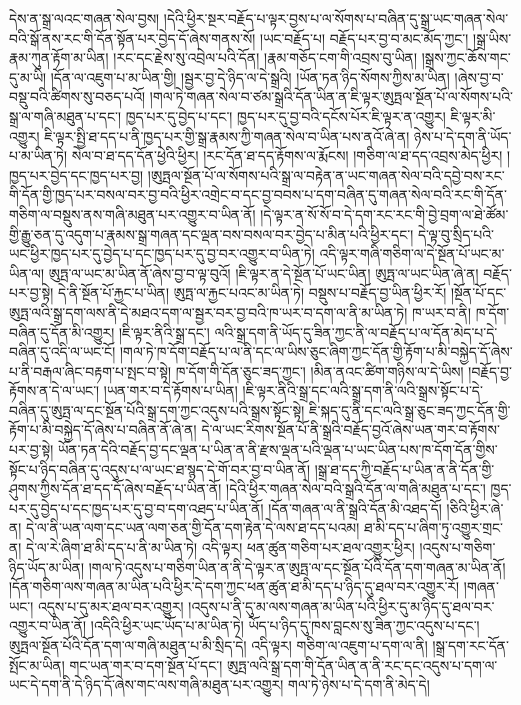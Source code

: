 དེས་ན་སྒྲ་ལའང་གཞན་སེལ་བྱས། །དེའི་ཕྱིར་སྔར་བརྗོད་པ་ལྟར་བྱས་པ་ལ་སོགས་པ་བཞིན་དུ་སྒྲ་ཡང་གཞན་སེལ་བའི་སྒོ་ནས་རང་གི་དོན་སྟོན་པར་བྱེད་དོ་ཞེས་གནས་སོ། །ཡང་བརྗོད་པ། བརྗོད་པར་བྱ་བ་མང་མོད་ཀྱང་། །སྒྲ་ཡིས་རྣམ་ཀུན་རྟོག་མ་ཡིན། །རང་དང་རྗེས་སུ་འབྲེལ་པའི་དོན། །རྣམ་གཅོད་ངག་གི་འབྲས་བུ་ཡིན། །སྒྲས་ཀྱང་ཆོས་གང་དུ་མ་ཡི། །དོན་ལ་འཇུག་པ་མ་ཡིན་གྱི། །སྦྱར་བྱ་དེ་ཉིད་ལ་དེ་སྒྲའི། །ཡོན་ཏན་ཉིད་སོགས་ཀྱིས་མ་ཡིན། །ཞེས་བྱ་བ་བསྡུ་བའི་ཚིགས་སུ་བཅད་པའོ། །གལ་ཏེ་གཞན་སེལ་བ་ཙམ་སྒྲའི་དོན་ཡིན་ན་ཇི་ལྟར་ཨུཏྤལ་སྔོན་པོ་ལ་སོགས་པའི་སྒྲ་ལ་གཞི་མཐུན་པ་དང་། ཁྱད་པར་དུ་བྱེད་པ་དང་། ཁྱད་པར་དུ་བྱ་བའི་དངོས་པོར་ཇི་ལྟར་ན་འགྱུར། ཇི་ལྟར་མི་འགྱུར། ཇི་ལྟར་སྤྱི་ཐ་དད་པ་ནི་ཁྱད་པར་གྱི་སྒྲ་རྣམས་ཀྱི་གཞན་སེལ་བ་ཡིན་པས་ནའོ་ཞེ་ན། ཉེས་པ་དེ་དག་ནི་ཡོད་པ་མ་ཡིན་ཏེ། སེལ་བ་ཐ་དད་དོན་ཕྱེའི་ཕྱིར། །རང་དོན་ཐ་དད་རྟོགས་ལ་རྨོངས། །གཅིག་ལ་ཐ་དད་འབྲས་མེད་ཕྱིར། །ཁྱད་པར་བྱེད་དང་ཁྱད་པར་བྱ། །ཨུཏྤལ་སྔོན་པོ་ལ་སོགས་པའི་སྒྲ་ལ་བརྟེན་ན་ཡང་གཞན་སེལ་བའི་དབྱེ་བས་རང་གི་དོན་གྱི་ཁྱད་པར་བསལ་བར་བྱ་བའི་ཕྱིར་འགྲེང་བ་དང་བྱ་བབས་པ་དག་བཞིན་དུ་གཞན་སེལ་བའི་རང་གི་དོན་གཅིག་ལ་བསྡུས་ནས་གཞི་མཐུན་པར་འགྱུར་བ་ཡིན་ནོ། །དེ་ལྟར་ན་སོ་སོ་བ་དེ་དག་རང་རང་གི་བྱེ་བྲག་ལ་ཐེ་ཚོམ་གྱི་རྒྱུ་ཅན་དུ་འདུག་པ་རྣམས་སྒྲ་གཞན་དང་ལྡན་བས་བསལ་བར་བྱེད་པ་མིན་པའི་ཕྱིར་དང་། དེ་ལྟ་བུ་སྲིད་པའི་ཡང་ཕྱིར་ཁྱད་པར་དུ་བྱེད་པ་དང་ཁྱད་པར་དུ་བྱ་བར་འགྱུར་བ་ཡིན་ཏེ། འདི་ལྟར་གཞི་གཅིག་ལ་དེ་སྔོན་པོ་ཡང་མ་ཡིན་ལ། ཨུཏྤ་ལ་ཡང་མ་ཡིན་ནོ་ཞེས་བྱ་བ་ལྟ་བུའོ། །ཇི་ལྟར་ན་དེ་སྔོན་པོ་ཡང་ཡིན། ཨུཏྤ་ལ་ཡང་ཡིན་ཞེ་ན། བརྗོད་པར་བྱ་སྟེ། དེ་ནི་སྔོན་པོ་རྐྱང་པ་ཡིན། ཨུཏྤ་ལ་རྐྱང་པའང་མ་ཡིན་ཏེ། བསྡུས་པ་བརྗོད་བྱ་ཡིན་ཕྱིར་རོ། །སྔོན་པོ་དང་ཨུཏྤ་ལའི་སྒྲ་དག་ལས་ནི་དེ་མཐའ་དག་ལ་སྦྱར་བར་བྱ་བའི་ཁ་ཡར་བ་དག་ལ་ནི་མ་ཡིན་ཏེ། ཁ་ཡར་བ་ནི། ཁ་དོག་བཞིན་དུ་དོན་མི་འགྱུར། །ཇི་ལྟར་ནིའི་སྒྲ་དང་། ལའི་སྒྲ་དག་ནི་ཡོད་དུ་ཟིན་ཀྱང་ནི་ལ་བརྗོད་པ་ལ་དོན་མེད་པ་དེ་བཞིན་དུ་འདི་ལ་ཡང་ངོ། །གལ་ཏེ་ཁ་དོག་བརྗོད་པ་ལ་ནི་དང་ལ་ཡིས་ཅུང་ཞིག་ཀྱང་དོན་གྱི་རྟོག་པ་མི་བསྐྱེད་དོ་ཞེས་པ་ནི་བརྒལ་ཞིང་བརྟག་པ་སྤང་བ་སྟེ། ཁ་དོག་གི་དོན་ཅུང་ཟད་ཀྱང་། །མིན་ནའང་ཚིག་གཉིས་ལ་དེ་ཡིས། །བརྗོད་བྱ་རྟོགས་ན་དེ་ལ་ཡང་། །ཡན་གར་བ་དེ་རྟོགས་པ་ཡིན། །ཇི་ལྟར་ནིའི་སྒྲ་དང་ལའི་སྒྲ་དག་ནི་ལའི་སྒྲས་སྟོང་པ་དེ་བཞིན་དུ་ཨུཏྤ་ལ་དང་སྔོན་པོའི་སྒྲ་དག་ཀྱང་འདུས་པའི་སྒྲས་སྟོང་སྟེ། ཇི་སྐད་དུ་ནི་དང་ལའི་སྒྲ་ཅུང་ཟད་ཀྱང་དོན་གྱི་རྟོག་པ་མི་བསྐྱེད་དོ་ཞེས་པ་བཞིན་ནོ་ཞེ་ན། དེ་ལ་ཡང་རིགས་སྔོན་པོ་ནི་སྒྲའི་བརྗོད་བྱའོ་ཞེས་ཡན་གར་བ་རྟོགས་པར་བྱ་སྟེ། ཡོན་ཏན་དེའི་བརྗོད་བྱ་དང་ལྡན་པ་ཡིན་ན་ནི་རྫས་ལྡན་པའི་ལྡན་པ་ཡང་ཡིན་པས་ཁ་དོག་དོན་གྱིས་སྟོང་པ་ཉིད་བཞིན་དུ་འདུས་པ་ལ་ཡང་ཐ་སྙད་དེ་གོ་བར་བྱ་བ་ཡིན་ནོ། །སྒྲ་ཐ་དད་ཀྱི་བརྗོད་པ་ཡིན་ན་ནི་དོན་གྱི་ཤུགས་ཀྱིས་དོན་ཐ་དད་དོ་ཞེས་བརྗོད་པ་ཡིན་ནོ། །དེའི་ཕྱིར་གཞན་སེལ་བའི་སྒྲའི་དོན་ལ་གཞི་མཐུན་པ་དང་། ཁྱད་པར་དུ་བྱེད་པ་དང་ཁྱད་པར་དུ་བྱ་བ་དག་འཐད་པ་ཡིན་ནོ། །དོན་གཞན་ལ་ནི་སྒྲའི་དོན་མི་འཐད་དོ། །ཅིའི་ཕྱིར་ཞེ་ན། དེ་ལ་ནི་ཡན་ལག་དང་ཡན་ལག་ཅན་གྱི་དོན་དག་རྟེན་དེ་ལས་ཐ་དད་པའམ། ཐ་མི་དད་པ་ཞིག་ཏུ་འགྱུར་གྲང་ན། དེ་ལ་རེ་ཞིག་ཐ་མི་དད་པ་ནི་མ་ཡིན་ཏེ། འདི་ལྟར། ཕན་ཚུན་གཅིག་པར་ཐལ་འགྱུར་ཕྱིར། །འདུས་པ་གཅིག་ཉིད་ཡོད་མ་ཡིན། །གལ་ཏེ་འདུས་པ་གཅིག་ཡིན་ན་ནི་དེ་ལྟར་ན་ཨུཏྤ་ལ་དང་སྔོན་པོའི་དོན་དག་གཞན་མ་ཡིན་ནོ། །དོན་གཅིག་ལས་གཞན་མ་ཡིན་པའི་ཕྱིར་དེ་དག་ཀྱང་ཕན་ཚུན་ཐ་མི་དད་པ་ཉིད་དུ་ཐལ་བར་འགྱུར་རོ། །གཞན་ཡང་། འདུས་པ་དུ་མར་ཐལ་བར་འགྱུར། །འདུས་པ་ནི་དུ་མ་ལས་གཞན་མ་ཡིན་པའི་ཕྱིར་དུ་མ་ཉིད་དུ་ཐལ་བར་འགྱུར་བ་ཡིན་ནོ། །འདིའི་ཕྱིར་ཡང་ཡོད་པ་མ་ཡིན་ཏེ། ཡོད་པ་ཉིད་དུ་ཁས་བླངས་སུ་ཟིན་ཀྱང་འདུས་པ་དང་། ཨུཏྤལ་སྔོན་པོའི་དོན་དག་ལ་གཞི་མཐུན་པ་མི་སྲིད་དེ། འདི་ལྟར། གཅིག་ལ་འཇུག་པ་དག་ལ་ནི། །སྒྲ་དག་རང་དོན་སྤོང་མ་ཡིན། གང་ཡན་གར་བ་དག་སྔོན་པོ་དང་། ཨུཏྤ་ལའི་སྒྲ་དག་གི་དོན་ཡིན་ན་ནི་རང་དང་འདུས་པ་དག་ལ་ཡང་དེ་དག་ནི་དེ་ཉིད་དོ་ཞེས་གང་ལས་གཞི་མཐུན་པར་འགྱུར། གལ་ཏེ་ཉེས་པ་དེ་དག་ནི་མེད་དེ། 